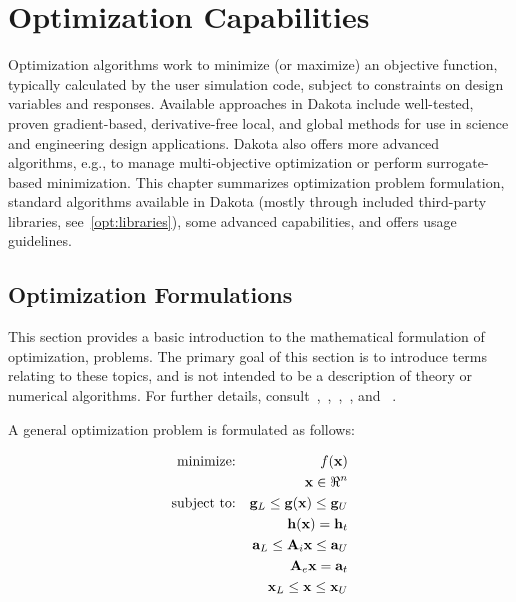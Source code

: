 \chapter{Optimization Capabilities}
\label{opt}

Optimization algorithms work to minimize (or maximize) an objective
function, typically calculated by the user simulation code, subject to
constraints on design variables and responses. Available approaches in
Dakota include well-tested, proven gradient-based, derivative-free
local, and global methods for use in science and engineering design
applications. Dakota also offers more advanced algorithms, e.g., to
manage multi-objective optimization or perform surrogate-based
minimization.  This chapter summarizes optimization problem
formulation, standard algorithms available in Dakota (mostly through
included third-party libraries, see~\ref{opt:libraries}), some
advanced capabilities, and offers usage guidelines.

\section{Optimization Formulations}
\label{opt:formulations}

This section provides a basic introduction to the mathematical
formulation of optimization, problems. The primary goal of this
section is to introduce terms relating to these topics, and is not
intended to be a description of theory or numerical algorithms. For
further details,
consult~\cite{Aro89},~\cite{Gil81},~\cite{Haf92},~\cite{Noc99}, and
~\cite{Van84}.

A general optimization problem is formulated as follows:

\begin{eqnarray}
  \hbox{minimize:} & & f(\mathbf{x})\nonumber\\
  & & \mathbf{x} \in \Re^{n}\nonumber\\
  \hbox{subject to:} & &
  \mathbf{g}_{L} \leq \mathbf{g(x)} \leq \mathbf{g}_U\nonumber\\
  & & \mathbf{h(x)}=\mathbf{h}_{t}\label{opt:formulations:equation01}\\
  & & \mathbf{a}_{L} \leq \mathbf{A}_i\mathbf{x} \leq
  \mathbf{a}_U\nonumber\\
  & & \mathbf{A}_{e}\mathbf{x}=\mathbf{a}_{t}\nonumber\\
  & & \mathbf{x}_{L} \leq \mathbf{x} \leq \mathbf{x}_U\nonumber
\end{eqnarray}

